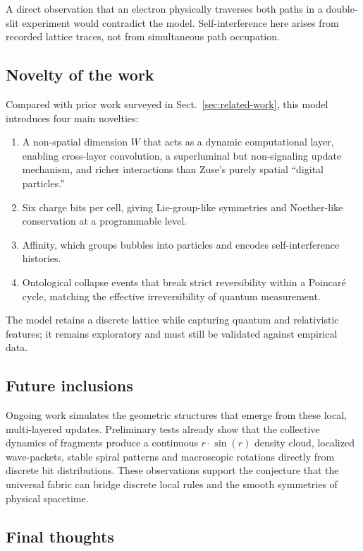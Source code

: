 \documentclass{ijuc}
\begin{document}
A direct observation that an electron physically traverses both paths in a double-slit experiment would contradict the model. Self-interference here arises from recorded lattice traces, not from simultaneous path occupation. 

\subsection{Novelty of the work}

Compared with prior work surveyed in Sect.~\ref{sec:related-work}, this model introduces four main novelties:
\begin{enumerate}
  \item A non-spatial dimension $W$ that acts as a dynamic computational layer, enabling cross-layer convolution, a superluminal but non-signaling update mechanism, and richer interactions than Zuse's purely spatial ``digital particles.''
  \item Six charge bits per cell, giving Lie-group-like symmetries and Noether-like conservation at a programmable level.
  \item Affinity, which groups bubbles into particles and encodes self-interference histories.
  \item Ontological collapse events that break strict reversibility within a Poincar\'{e} cycle, matching the effective irreversibility of quantum measurement.
\end{enumerate}
The model retains a discrete lattice while capturing quantum and relativistic features; it remains exploratory and must still be validated against empirical data.

\subsection{Future inclusions}

Ongoing work simulates the geometric structures that emerge from these local, multi-layered updates. Preliminary tests already show that the collective dynamics of fragments produce a continuous $r \cdot \sin(r)$ density cloud, localized wave-packets, stable spiral patterns and macroscopic rotations directly from discrete bit distributions. These observations support the conjecture that the universal fabric can bridge discrete local rules and the smooth symmetries of physical spacetime.

\subsection{Final thoughts}
\end{document}
